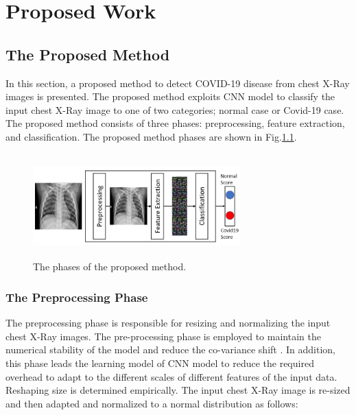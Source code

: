 
\chapter{Proposed Work} %

\label{chp:proposed} %





\section{The Proposed Method}
In this section,  a  proposed  method to detect COVID-19 disease from chest X-Ray images is presented. The proposed method exploits CNN model to classify the  input chest X-Ray image to one of two categories; normal case or Covid-19 case. The proposed method consists of three phases: preprocessing, feature extraction, and classification. The proposed method phases are shown in Fig.\ref{fig1}. 


\begin{figure}
\begin{center}
\includegraphics[height=40mm,width=8.0cm]{Figures/fig1.jpg}
\caption{The phases of the proposed method.}
\end{center}
\label{fig1}
\end{figure}



\subsection{The Preprocessing Phase}

The preprocessing phase is responsible for resizing and normalizing the  input  chest X-Ray images. The pre-processing phase is employed to maintain the numerical stability of the model and reduce the co-variance shift \cite{lecun1989handwritten}. In addition, this phase leads the learning model of CNN model to reduce  the required overhead to adapt to the different scales of different features of the input data. Reshaping size is determined empirically. The input  chest X-Ray image is re-sized and then  adapted and normalized to a normal distribution as follows:

